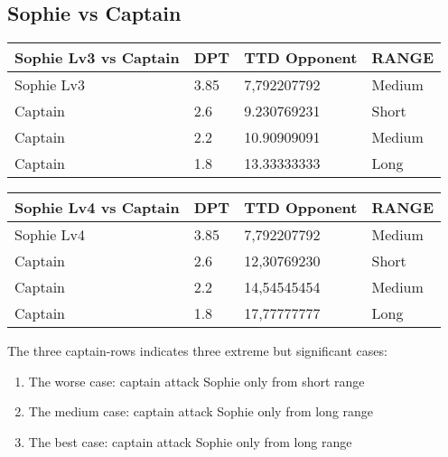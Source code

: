 \subsection{Sophie vs Captain}
\begin{table}[H]
  \centering
\begin{tabular}{|l|l|l|l|}
\hline
\rowcolor[HTML]{C0C0C0} 
\textbf{Sophie Lv3 vs Captain} & \textbf{DPT} & \textbf{TTD Opponent} & \textbf{RANGE} \\ \hline
Sophie Lv3 & 3.85 & 7,792207792 & Medium \\ \hline
Captain & 2.6 & 9.230769231 & Short \\ \hline
Captain & 2.2 & 10.90909091 & Medium \\ \hline
Captain & 1.8 & 13.33333333 & Long \\ \hline
\end{tabular}
\end{table}
\begin{table}[H]
  \centering
\begin{tabular}{|l|l|l|l|}
\hline
\rowcolor[HTML]{C0C0C0} 
\textbf{Sophie Lv4 vs Captain} & \textbf{DPT} & \textbf{TTD Opponent} & \textbf{RANGE} \\ \hline
Sophie Lv4 & 3.85 & 7,792207792 & Medium \\ \hline
Captain & 2.6 & 12,30769230 & Short \\ \hline
Captain & 2.2 & 14,54545454 & Medium \\ \hline
Captain & 1.8 & 17,77777777 & Long \\ \hline
\end{tabular}
\end{table}
The three captain-rows indicates three extreme but significant cases:
\begin{enumerate}
\item The worse case: captain attack Sophie only from short range
\item The medium case: captain attack Sophie only  from long range
\item The best case: captain attack Sophie only  from long range
\end{enumerate}

